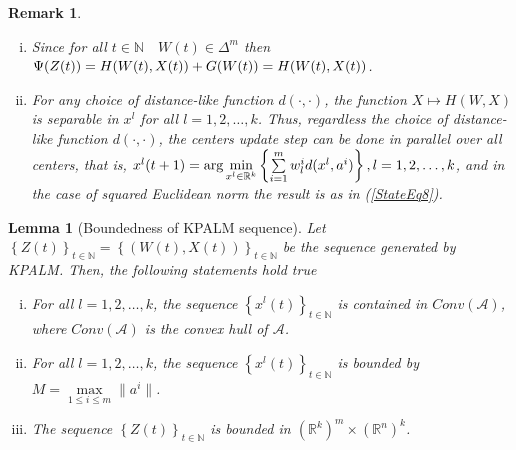 \documentclass[11pt]{article}
\numberwithin{equation}{section}
\newtheorem{lemma}{Lemma}[proposition]
\newtheorem{remark}{Remark}
\begin{document}
\begin{remark} 
	\begin{enumerate}[(i)] \label{StateEq15}
		\item Since for all $t \in \mathbb{N} \quad W(t) \in \Delta^m$ then $\Psi(Z(t)) = H(W(t),X(t)) + G(W(t)) \\ = H(W(t),X(t))$. \label{StateEq16}
		\item For any choice of distance-like function $d(\cdot, \cdot)$, the function $X \mapsto H(W,X)$ is separable in $x^l$ for all $l = 1, 2, \ldots, k$. Thus, regardless the choice of distance-like function $d(\cdot, \cdot)$, the centers update step can be done in parallel over all centers, that is, $x^l(t+1) = \arg\min\limits_{x^l \in \mathbb{R}^k} \left\lbrace \sum\limits_{i=1}^{m} w^i_l d(x^l , a^i) \right\rbrace, \\ l = 1, 2, \ldots, k$, and in the case of squared Euclidean norm the result is as in (\ref{StateEq8}).
	\end{enumerate}
\end{remark}

\begin{lemma}[Boundedness of KPALM sequence]
Let $\left\lbrace Z(t) \right\rbrace_{t \in \mathbb{N}} = \left\lbrace (W(t) , X(t)) \right\rbrace_{t \in \mathbb{N}}$ be the sequence generated by KPALM. Then, the following statements hold true
\begin{enumerate}[(i)]
	\item For all $l=1, 2, \ldots ,k$, the sequence $\left\lbrace x^l(t) \right\rbrace_{t \in \mathbb{N}}$ is contained in $Conv(\mathcal{A})$, where $Conv(\mathcal{A})$ is the convex hull of $\mathcal{A}$.
	\item For all $l=1, 2, \ldots ,k$, the sequence $\left\lbrace x^l(t) \right\rbrace_{t \in \mathbb{N}}$ is bounded by $M = \max\limits_{1 \leq i \leq m} \| a^i \|$.
	\item The sequence $\left\lbrace Z(t) \right\rbrace_{t \in \mathbb{N}}$ is bounded in $(\mathbb{R}^k)^m \times (\mathbb{R}^n)^k$.
\end{enumerate}
\end{lemma}
\end{document}

